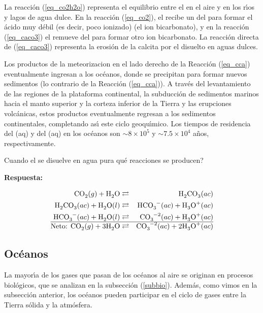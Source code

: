 La reacci\'on (\ref{eq_co2h2o}) representa el equilibrio entre el  en el aire y en los r\'{\i}os y lagos de agua dulce. En la reacci\'on (\ref{eq_co2}), el  recibe un   del  para formar el \'acido muy d\'ebil (es decir, poco ionizado)  (el ion bicarbonato), y en la reacci\'on (\ref{eq_caco3}) el  remueve  del  para formar otro ion bicarbonato. La reacci\'on directa de (\ref{eq_caco3}) representa la erosi\'on de la calcita por el   disuelto en aguas dulces.

Los productos de la \gls{meteorizacion} en el lado derecho de la Reacci\'on (\ref{eq_cca}) eventualmente ingresan a los oc\'eanos, donde se precipitan para formar nuevos sedimentos (lo contrario de la Reacci\'on (\ref{eq_cca})). A trav\'es del levantamiento de las regiones de la plataforma continental, la subducci\'on de sedimentos marinos hacia el manto superior y la corteza inferior de la Tierra y las erupciones volc\'anicas, estos productos eventualmente regresan a los sedimentos continentales, completando as\'{\i} este ciclo geoqu\'{\i}mico. Los tiempos de residencia del (aq) y del (aq) en los oc\'eanos son $\sim 8\times 10^5$ y $\sim7.5 \times 10^4$ a\~nos, respectivamente.

\begin{example}
Cuando el  se disuelve en agua pura \textquestiondown qu\'e reacciones se producen?

\textbf{Respuesta:}

\begin{footnotesize}
\begin{eqnarray}
\ce{CO2}(g) + \ce{H2O} &\rightleftarrows& \ce{H2CO3}(ac) \\
\ce{H2CO3}(ac) + \ce{H2O}(l) &\rightleftarrows&  \ce{HCO3^-}(ac) + \ce{H3O^+}(ac) \\
 \ce{HCO3^-}(ac) + \ce{H2O}(l) &\rightleftarrows&  \ce{CO3^{-2}}(ac) + \ce{H3O^+}(ac) \\ \hline
 \textrm{Neto:         } \ce{CO2}(g) + 3\ce{H2O} &\rightleftarrows& \ce{CO3^{-2}}(ac) +2 \ce{H3O^+}(ac) 
 \end{eqnarray}
\end{footnotesize}
\end{example}

\subsection{Oc\'eanos}
La mayor\'{\i}a de los gases que pasan de los oc\'eanos al aire se originan en procesos biol\'ogicos, que se analizan en la subsecci\'on (\ref{subbio}). Adem\'as, como vimos en la subsecci\'on anterior, los oc\'eanos pueden participar en el ciclo de gases entre la Tierra s\'olida y la atm\'osfera. 

